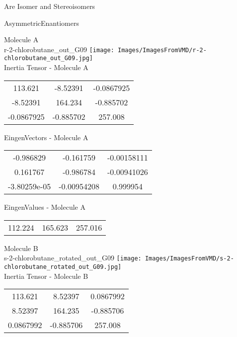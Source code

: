 \begin{center}
\vtab
\vtab
\textcolor{NavyBlue}{\Large Are Isomer and Stereoisomers}
\end{center}
\newpage

\vtab[-2cm]
\begin{center}
{\large AsymmetricEnantiomers}
\end{center}
\begin{multicols}{2}
\begin{center}
Molecule A \\ 
r-2-chlorobutane\_out\_G09
\texttt{[image: Images/ImagesFromVMD/r-2-chlorobutane\_out\_G09.jpg]}
\\
Inertia Tensor - Molecule A \\
\vtab
\begin{tabular}{|c c c|}
113.621	 & 	-8.52391	 & 	-0.0867925	 \\
-8.52391	 & 	164.234	 & 	-0.885702	 \\
-0.0867925	 & 	-0.885702	 & 	257.008
\end{tabular}

\vtab
 EingenVectors - Molecule A     \\
\vtab
\begin{tabular}{|c c c|}
-0.986829	 & 	-0.161759	 & 	-0.00158111	 \\
0.161767	 & 	-0.986784	 & 	-0.00941026	 \\
-3.80259e-05	 & 	-0.00954208	 & 	0.999954
\end{tabular}

\vtab
 EingenValues - Molecule A     \\
\vtab
\begin{tabular}{|c c c|}
112.224	 & 	165.623	 & 	257.016
\end{tabular}
\columnbreak

Molecule B \\ 
s-2-chlorobutane\_rotated\_out\_G09
\texttt{[image: Images/ImagesFromVMD/s-2-chlorobutane\_rotated\_out\_G09.jpg]}
\\
Inertia Tensor - Molecule B \\
\vtab
\begin{tabular}{|c c c|}
113.621	 & 	8.52397	 & 	0.0867992	 \\
8.52397	 & 	164.235	 & 	-0.885706	 \\
0.0867992	 & 	-0.885706	 & 	257.008
\end{tabular}


\end{center}
\end{multicols}
